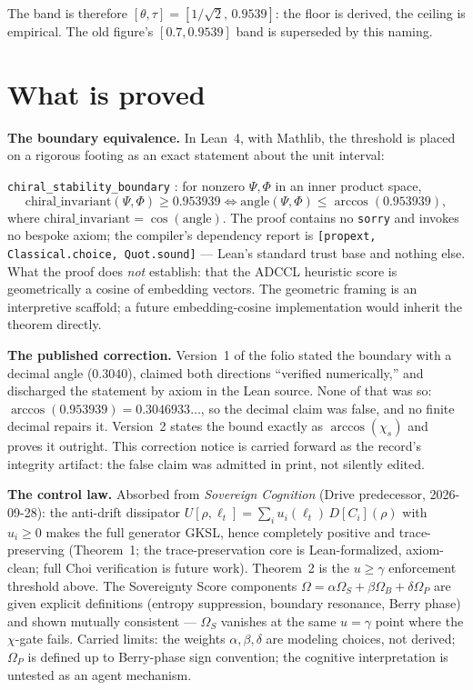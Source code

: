 \documentclass{alienfolio}
\begin{document}
The band is therefore $[\theta, \tau] = [1/\sqrt{2},\, 0.9539]$: the floor is
derived, the ceiling is empirical. The old figure's $[0.7, 0.9539]$ band is
superseded by this naming.

\section{What is proved}
\textbf{The boundary equivalence.} In Lean~4, with Mathlib, the threshold is
placed on a rigorous footing as an exact statement about the unit interval:

\texttt{chiral\_\allowbreak stability\_\allowbreak boundary} : for nonzero $\Psi, \Phi$ in an inner
product space,
\[
\mathrm{chiral\_invariant}(\Psi,\Phi) \geq 0.953939 \iff
\mathrm{angle}(\Psi,\Phi) \leq \arccos(0.953939),
\]
where $\mathrm{chiral\_invariant} = \cos(\mathrm{angle})$.
 The proof contains no \texttt{sorry} and invokes no bespoke
axiom; the compiler's dependency report is
\texttt{[propext, Classical.choice, Quot.sound]} --- Lean's standard trust
base and nothing else. What the proof does \emph{not} establish: that the
ADCCL heuristic score is geometrically a cosine of embedding vectors. The
geometric framing is an interpretive scaffold; a future embedding-cosine
implementation would inherit the theorem directly.

\textbf{The published correction.} Version~1 of the folio stated the boundary
with a decimal angle ($0.3040$), claimed both directions ``verified
numerically,'' and discharged the statement by axiom in the Lean source. None
of that was so: $\arccos(0.953939) = 0.3046933\ldots$, so the decimal claim
was false, and no finite decimal repairs it. Version~2 states the bound
exactly as $\arccos(\chi_s)$ and proves it outright. This correction notice is
carried forward as the record's integrity artifact: the false claim was
admitted in print, not silently edited.

\textbf{The control law.} Absorbed from \emph{Sovereign Cognition}
(Drive predecessor, 2026-09-28): the anti-drift dissipator
$U[\rho, \ell_t] = \sum_i u_i(\ell_t)\, D[C_i](\rho)$ with $u_i \geq 0$ makes
the full generator GKSL, hence completely positive and trace-preserving
(Theorem~1; the trace-preservation core is Lean-formalized, axiom-clean; full
Choi verification is future work). Theorem~2 is the $u \geq \gamma$
enforcement threshold above. The Sovereignty Score components
$\Omega = \alpha\Omega_S + \beta\Omega_B + \delta\Omega_P$ are given explicit
definitions (entropy suppression, boundary resonance, Berry phase) and shown
mutually consistent --- $\Omega_S$ vanishes at the same $u = \gamma$ point
where the $\chi$-gate fails. Carried limits: the weights $\alpha,\beta,\delta$
are modeling choices, not derived; $\Omega_P$ is defined up to Berry-phase
sign convention; the cognitive interpretation is untested as an agent
mechanism.
\end{document}
